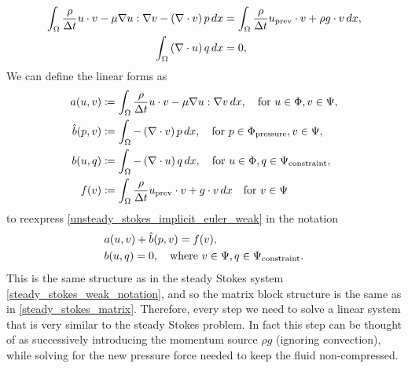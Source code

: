 \begin{equation}\label{unsteady_stokes_implicit_euler_weak}
\begin{split}
    \int_{\Omega} \frac{\rho}{\Delta t} u\cdot v - \mu\nabla u:\nabla v - \left(\nabla\cdot v\right)p\,dx
        &= \int_{\Omega} \frac{\rho}{\Delta t}{u_{\text{prev}}}\cdot v + \rho g \cdot v\,dx,\\
    \quad \int_{\Omega} \left(\nabla\cdot u\right) q\,dx &= 0,
\end{split}
\end{equation}
We can define the linear forms as
\begin{equation}
\begin{split}
    a(u, v) &\coloneqq \int_{\Omega}\frac{\rho}{\Delta t}u\cdot v -\mu\nabla u : \nabla v\,dx,\quad\text{for $u \in \Phi, v \in \Psi$},\\
    \hat{b}(p, v) &\coloneqq \int_{\Omega}-\left(\nabla\cdot v\right)p\,dx,\quad\text{for $p \in {\Phi_{\text{pressure}}}, v \in \Psi$},\\
    b(u, q) &\coloneqq \int_{\Omega}-\left(\nabla\cdot u\right)q\,dx,\quad\text{for $u \in \Phi, q \in {\Psi_{\text{constraint}}}$},\\
    f(v) &\coloneqq \int_{\Omega} \frac{\rho}{\Delta t}{u_{\text{prev}}}\cdot v + g\cdot v\,dx\quad\text{for $v \in \Psi$}
\end{split}
\end{equation}
to reexpress \eqref{unsteady_stokes_implicit_euler_weak} in the notation
\begin{equation}
\begin{split}
    &a(u, v) + \hat{b}(p, v) = f(v),\\
    &b(u, q) = 0, \quad\text{where $v \in \Psi, q \in {\Psi_{\text{constraint}}}$}.
\end{split}
\end{equation}
This is the same structure as in the steady Stokes system \eqref{steady_stokes_weak_notation},
and so the matrix block structure is the same as in \eqref{steady_stokes_matrix}. Therefore, every step we need to solve a linear system
that is very similar to the steady Stokes problem. In fact this step can be thought of as successively introducing the momentum source $\rho g$
(ignoring convection), while solving for the new pressure force needed to keep the fluid non-compressed.

